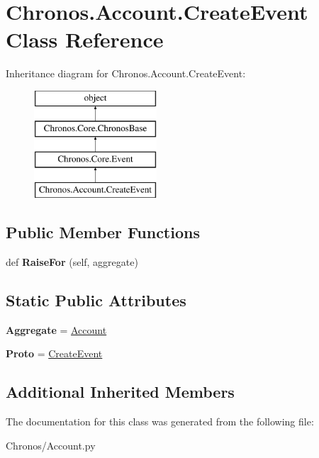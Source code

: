 \hypertarget{classChronos_1_1Account_1_1CreateEvent}{}\section{Chronos.\+Account.\+Create\+Event Class Reference}
\label{classChronos_1_1Account_1_1CreateEvent}
Inheritance diagram for Chronos.\+Account.\+Create\+Event\+:\begin{figure}[H]
\begin{center}
\leavevmode
\includegraphics[height=4.000000cm]{classChronos_1_1Account_1_1CreateEvent}
\end{center}
\end{figure}
\subsection*{Public Member Functions}
\begin{DoxyCompactItemize}
\item 
def {\bfseries Raise\+For} (self, aggregate)\hypertarget{classChronos_1_1Account_1_1CreateEvent_a4f6af743e40040061e3dc2f35e51ecb9}{}\label{classChronos_1_1Account_1_1CreateEvent_a4f6af743e40040061e3dc2f35e51ecb9}

\end{DoxyCompactItemize}
\subsection*{Static Public Attributes}
\begin{DoxyCompactItemize}
\item 
{\bfseries Aggregate} = \hyperlink{classChronos_1_1Account_1_1Account}{Account}\hypertarget{classChronos_1_1Account_1_1CreateEvent_ae2395ebb0279d2796d2dd686498f85ef}{}\label{classChronos_1_1Account_1_1CreateEvent_ae2395ebb0279d2796d2dd686498f85ef}

\item 
{\bfseries Proto} = \hyperlink{classChronos_1_1Account_1_1CreateEvent}{Create\+Event}\hypertarget{classChronos_1_1Account_1_1CreateEvent_aafbdf5c85611fc863f0906d59e3a7083}{}\label{classChronos_1_1Account_1_1CreateEvent_aafbdf5c85611fc863f0906d59e3a7083}

\end{DoxyCompactItemize}
\subsection*{Additional Inherited Members}


The documentation for this class was generated from the following file\+:\begin{DoxyCompactItemize}
\item 
Chronos/Account.\+py\end{DoxyCompactItemize}
